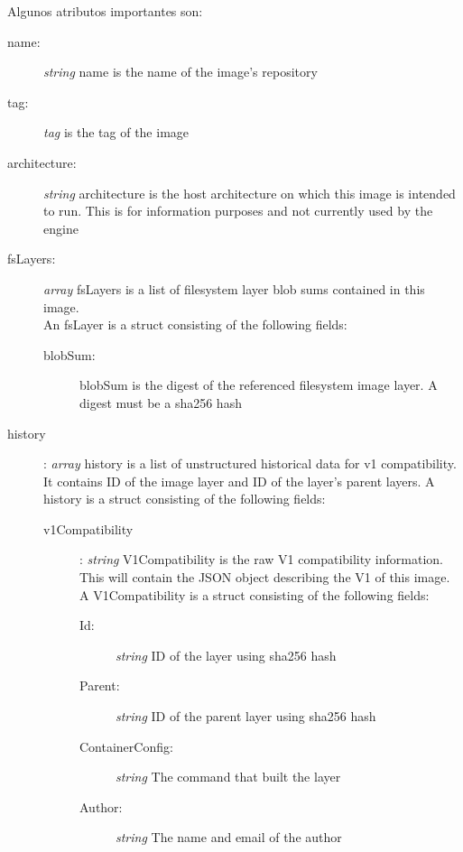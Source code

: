 Algunos atributos importantes son:

\begin{description}
	\item [name:] \textit{string} name is the name of the image’s repository
	\item [tag:] \textit{tag} is the tag of the image
	\item [architecture:] \textit{string} architecture is the host architecture on which this image is intended to run. This is for information purposes and not currently used by the engine
	\item [fsLayers:] \textit{array} fsLayers is a list of filesystem layer blob sums contained in this image. \\ 
		An fsLayer is a struct consisting of the following fields:
		\begin{description}
			\item [blobSum:] blobSum is the digest of the referenced filesystem image layer. A digest must be a sha256 hash
		\end{description}
	\item [history]: \textit{array} history is a list of unstructured historical data for v1 compatibility. It contains ID of the image layer and ID of the layer’s parent layers. A history is a struct consisting of the following fields:
	\begin{description}
		\item[v1Compatibility]:  \textit{string} V1Compatibility is the raw V1 compatibility information. This will contain the JSON object describing the V1 of this image. A V1Compatibility is a struct consisting of the following fields:
		
		\begin{description}
			\item [Id:] \textit{string} ID of the layer using sha256 hash
			\item [Parent:] \textit{string} ID of the parent layer using sha256 hash
			\item [ContainerConfig:] \textit{string} The command that built the layer
			\item [Author:] \textit{string} The name and email of the author
		\end{description}
	\end{description}
\end{description}




